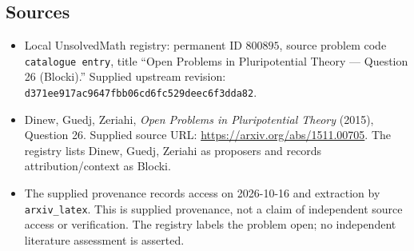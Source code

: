 \documentclass[11pt]{article}
\begin{document}
\subsection{Sources}
\begin{itemize}
\item Local UnsolvedMath registry: permanent ID \(800895\), source problem code \texttt{catalogue entry}, title ``Open Problems in Pluripotential Theory --- Question 26 (Blocki).'' Supplied upstream revision: \texttt{d371ee917ac9647fbb06cd6fc529deec6f3dda82}.
\item Dinew, Guedj, Zeriahi, \emph{Open Problems in Pluripotential Theory} (2015), Question 26. Supplied source URL: \url{https://arxiv.org/abs/1511.00705}. The registry lists Dinew, Guedj, Zeriahi as proposers and records attribution/context as Blocki.
\item The supplied provenance records access on 2026-10-16 and extraction by \texttt{arxiv\_latex}. This is supplied provenance, not a claim of independent source access or verification. The registry labels the problem open; no independent literature assessment is asserted.
\end{itemize}
\end{document}
